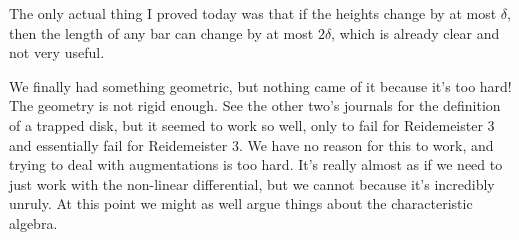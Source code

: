 \documentclass[11pt,oneside]{amsart}
\begin{document}
The only actual thing I proved today was that if the heights change by at most $\delta$, then the length of any bar can change by at most $2\delta$, which is already clear and not very useful.

We finally had something geometric, but nothing came of it because it's too hard! The geometry is not rigid enough. See the other two's journals for the definition of a trapped disk, but it seemed to work so well, only to fail for Reidemeister 3 and essentially fail for Reidemeister 3. We have no reason for this to work, and trying to deal with augmentations is too hard. It's really almost as if we need to just work with the non-linear differential, but we cannot because it's incredibly unruly. At this point we might as well argue things about the characteristic algebra.
\end{document}
